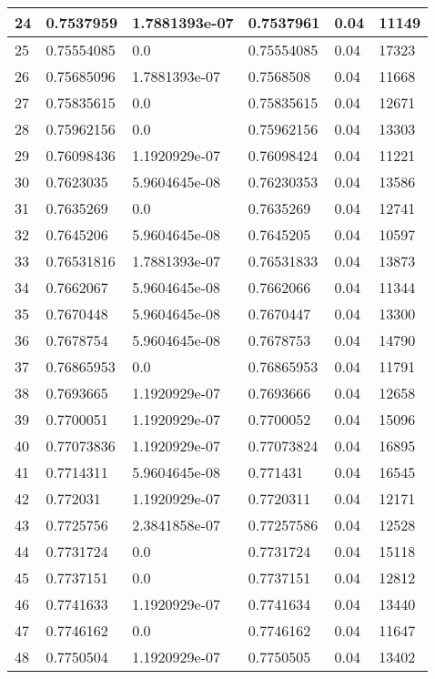 \begin{longtable}{|l|l|l|l|l|l|}
24 & 0.7537959 & 1.7881393e-07 & 0.7537961 & 0.04 & 11149 \\ \hline 
25 & 0.75554085 & 0.0 & 0.75554085 & 0.04 & 17323 \\ \hline 
26 & 0.75685096 & 1.7881393e-07 & 0.7568508 & 0.04 & 11668 \\ \hline 
27 & 0.75835615 & 0.0 & 0.75835615 & 0.04 & 12671 \\ \hline 
28 & 0.75962156 & 0.0 & 0.75962156 & 0.04 & 13303 \\ \hline 
29 & 0.76098436 & 1.1920929e-07 & 0.76098424 & 0.04 & 11221 \\ \hline 
30 & 0.7623035 & 5.9604645e-08 & 0.76230353 & 0.04 & 13586 \\ \hline 
31 & 0.7635269 & 0.0 & 0.7635269 & 0.04 & 12741 \\ \hline 
32 & 0.7645206 & 5.9604645e-08 & 0.7645205 & 0.04 & 10597 \\ \hline 
33 & 0.76531816 & 1.7881393e-07 & 0.76531833 & 0.04 & 13873 \\ \hline 
34 & 0.7662067 & 5.9604645e-08 & 0.7662066 & 0.04 & 11344 \\ \hline 
35 & 0.7670448 & 5.9604645e-08 & 0.7670447 & 0.04 & 13300 \\ \hline 
36 & 0.7678754 & 5.9604645e-08 & 0.7678753 & 0.04 & 14790 \\ \hline 
37 & 0.76865953 & 0.0 & 0.76865953 & 0.04 & 11791 \\ \hline 
38 & 0.7693665 & 1.1920929e-07 & 0.7693666 & 0.04 & 12658 \\ \hline 
39 & 0.7700051 & 1.1920929e-07 & 0.7700052 & 0.04 & 15096 \\ \hline 
40 & 0.77073836 & 1.1920929e-07 & 0.77073824 & 0.04 & 16895 \\ \hline 
41 & 0.7714311 & 5.9604645e-08 & 0.771431 & 0.04 & 16545 \\ \hline 
42 & 0.772031 & 1.1920929e-07 & 0.7720311 & 0.04 & 12171 \\ \hline 
43 & 0.7725756 & 2.3841858e-07 & 0.77257586 & 0.04 & 12528 \\ \hline 
44 & 0.7731724 & 0.0 & 0.7731724 & 0.04 & 15118 \\ \hline 
45 & 0.7737151 & 0.0 & 0.7737151 & 0.04 & 12812 \\ \hline 
46 & 0.7741633 & 1.1920929e-07 & 0.7741634 & 0.04 & 13440 \\ \hline 
47 & 0.7746162 & 0.0 & 0.7746162 & 0.04 & 11647 \\ \hline 
48 & 0.7750504 & 1.1920929e-07 & 0.7750505 & 0.04 & 13402 \\ \hline 

\end{longtable}
